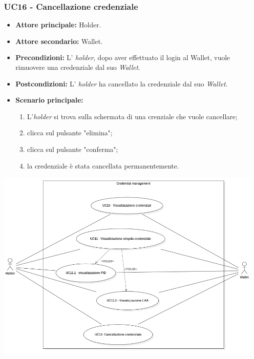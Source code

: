\subsubsection{UC16 - Cancellazione credenziale}
\begin{itemize}
\item \textbf{Attore principale:} Holder.
\item \textbf{Attore secondario:} Wallet.
\item \textbf{Precondizioni:} L' \textit{holder}, dopo aver effettuato il login al Wallet, vuole rimuovere una credenziale dal suo \textit{Wallet}.
\item \textbf{Postcondizioni:} L' \textit{holder} ha cancellato la credenziale dal suo \textit{Wallet}.
\item \textbf{Scenario principale:} 
    \begin{enumerate}
    \item L'\textit{holder} si trova sulla schermata di una crenziale che vuole cancellare; 
    \item clicca sul pulsante "elimina"; 
    \item clicca sul pulsante "conferma"; 
    \item la credenziale è stata cancellata permanentemente.
    \end{enumerate}
\end{itemize}

\begin{center}
    \includegraphics[scale = 0.65]{./res/img/UC3.PNG}
  \end{center}

